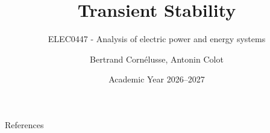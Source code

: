 \documentclass[aspectratio=169]{beamer}
\subtitle{ELEC0447 - Analysis of electric power and energy systems}
\title{Transient Stability}
\author[BC]{Bertrand Cornélusse, Antonin Colot}
\institute{University of Liège}
\date{Academic Year 2026--2027}
\begin{document}


\begin{frame}[allowframebreaks]{References}
    
    
\end{frame}
\end{document}
